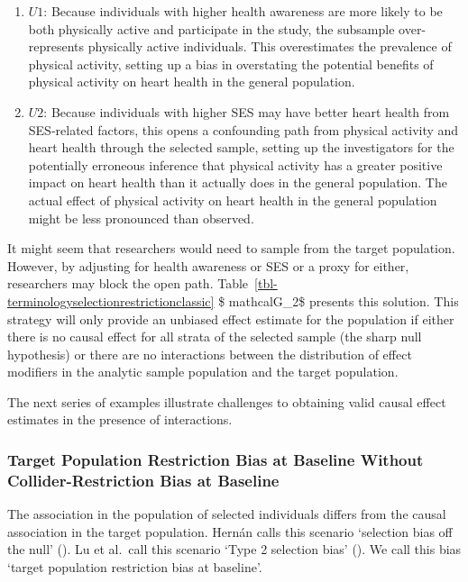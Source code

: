 \documentclass[
  single column]{article}
\begin{document}
\begin{enumerate}
\def\labelenumi{\arabic{enumi}.}
\item
  \textbf{\(U1\)}: Because individuals with higher health awareness are
  more likely to be both physically active and participate in the study,
  the subsample over-represents physically active individuals. This
  overestimates the prevalence of physical activity, setting up a bias
  in overstating the potential benefits of physical activity on heart
  health in the general population.
\item
  \textbf{\(U2\)}: Because individuals with higher SES may have better
  heart health from SES-related factors, this opens a confounding path
  from physical activity and heart health through the selected sample,
  setting up the investigators for the potentially erroneous inference
  that physical activity has a greater positive impact on heart health
  than it actually does in the general population. The actual effect of
  physical activity on heart health in the general population might be
  less pronounced than observed.
\end{enumerate}

It might seem that researchers would need to sample from the target
population. However, by adjusting for health awareness or SES or a proxy
for either, researchers may block the open path.
Table~\ref{tbl-terminologyselectionrestrictionclassic} \$ mathcalG\_2\$
presents this solution. This strategy will only provide an unbiased
effect estimate for the population if either there is no causal effect
for all strata of the selected sample (the sharp null hypothesis) or
there are no interactions between the distribution of effect modifiers
in the analytic sample population and the target population.

The next series of examples illustrate challenges to obtaining valid
causal effect estimates in the presence of interactions.

\subsubsection{Target Population Restriction Bias at Baseline Without
Collider-Restriction Bias at
Baseline}\label{target-population-restriction-bias-at-baseline-without-collider-restriction-bias-at-baseline}

\begin{table}

\caption{\label{tbl-terminologyselectionrestrictionbaseline}The
association in the population of selected individuals differs from the
causal association in the target population. Hernán calls this scenario
`selection bias off the null' (). Lu et al.~call this scenario `Type 2 selection bias'
(). We call this bias
`target population restriction bias at baseline'.}

\centering{

\terminologyselectionrestrictionbaseline

}

\end{table}%
\end{document}
